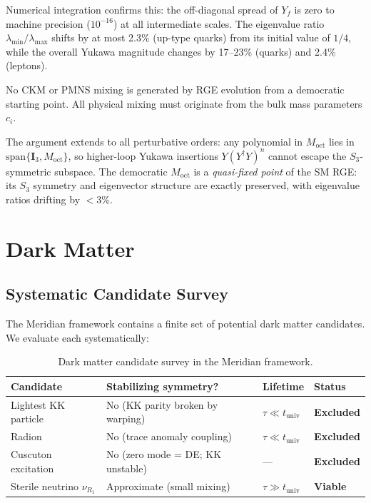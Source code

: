 Numerical integration confirms this: the off-diagonal spread of $Y_f$ is zero to machine precision ($10^{-16}$) at all intermediate scales. The eigenvalue ratio $\lambda_{\min}/\lambda_{\max}$ shifts by at most 2.3\% (up-type quarks) from its initial value of $1/4$, while the overall Yukawa magnitude changes by 17--23\% (quarks) and 2.4\% (leptons).

\begin{corollary}\label{cor:4-no-ckm-from-rge}
No CKM or PMNS mixing is generated by RGE evolution from a democratic starting point. All physical mixing must originate from the bulk mass parameters $c_i$.
\end{corollary}

The argument extends to all perturbative orders: any polynomial in $M_{\mathrm{oct}}$ lies in $\mathrm{span}\{\mathbf{I}_3, M_{\mathrm{oct}}\}$, so higher-loop Yukawa insertions $Y(Y^\dagger Y)^n$ cannot escape the $S_3$-symmetric subspace. The democratic $M_{\mathrm{oct}}$ is a \emph{quasi-fixed point} of the SM RGE: its $S_3$ symmetry and eigenvector structure are exactly preserved, with eigenvalue ratios drifting by $< 3\%$.


\section{Dark Matter}
\label{sec:4-dm}

\subsection{Systematic Candidate Survey}
\label{sec:4-dm-survey}

The Meridian framework contains a finite set of potential dark matter candidates. We evaluate each systematically:

\begin{table}[htbp]
\centering
\caption{Dark matter candidate survey in the Meridian framework.}
\label{tab:4-dm}
\small
\begin{tabular}{@{}llll@{}}
\toprule
Candidate & Stabilizing symmetry? & Lifetime & Status \\
\midrule
Lightest KK particle & No (KK parity broken by warping) & $\tau \ll t_{\mathrm{univ}}$ & \textbf{Excluded} \\
Radion & No (trace anomaly coupling) & $\tau \ll t_{\mathrm{univ}}$ & \textbf{Excluded} \\
Cuscuton excitation & No (zero mode = DE; KK unstable) & --- & \textbf{Excluded} \\
Sterile neutrino $\nu_{R_1}$ & Approximate (small mixing) & $\tau \gg t_{\mathrm{univ}}$ & \textbf{Viable} \\
\bottomrule
\end{tabular}
\end{table}

